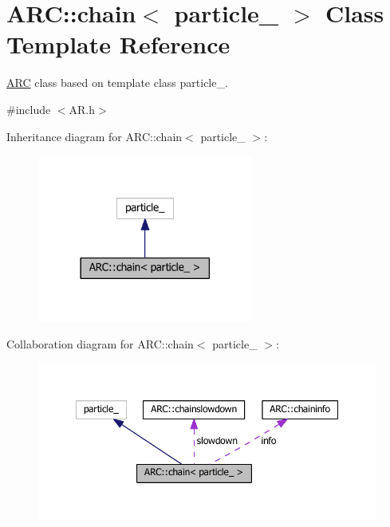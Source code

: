 \hypertarget{classARC_1_1chain}{}\section{A\+RC\+:\+:chain$<$ particle\+\_\+ $>$ Class Template Reference}
\label{classARC_1_1chain}


\hyperlink{namespaceARC}{A\+RC} class based on template class particle\+\_\+.  




{\ttfamily \#include $<$A\+R.\+h$>$}



Inheritance diagram for A\+RC\+:\+:chain$<$ particle\+\_\+ $>$\+:
\nopagebreak
\begin{figure}[H]
\begin{center}
\leavevmode
\includegraphics[width=201pt]{classARC_1_1chain__inherit__graph}
\end{center}
\end{figure}


Collaboration diagram for A\+RC\+:\+:chain$<$ particle\+\_\+ $>$\+:
\nopagebreak
\begin{figure}[H]
\begin{center}
\leavevmode
\includegraphics[width=350pt]{classARC_1_1chain__coll__graph}
\end{center}
\end{figure}
